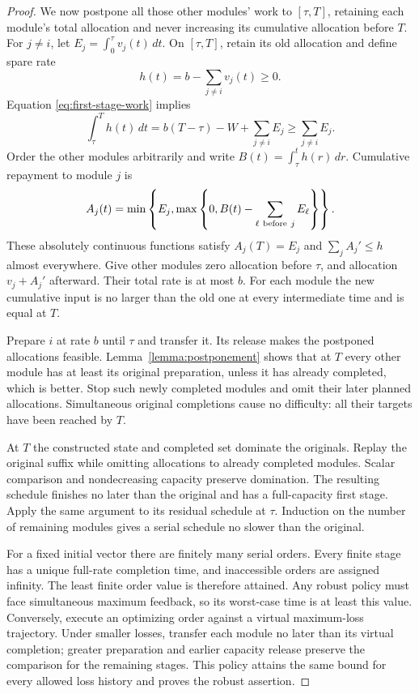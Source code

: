 \begin{proof}
We now postpone all those other modules' work to \([\tau,T]\), retaining
each module's total allocation and never increasing its cumulative allocation
before \(T\). For \(j\ne i\), let
\(E_j=\int_0^\tau v_j(t)\,dt\). On \([\tau,T]\), retain its old allocation
and define spare rate
\[
 h(t)=b-\sum_{j\ne i}v_j(t)\geq0.
\]
Equation \eqref{eq:first-stage-work} implies
\[
 \int_\tau^T h(t)\,dt
 =b(T-\tau)-W+\sum_{j\ne i}E_j
 \geq\sum_{j\ne i}E_j.
\]
Order the other modules arbitrarily and write
\(B(t)=\int_\tau^t h(r)\,dr\). Cumulative repayment to module \(j\) is
\[
 A_j(t)=\min\left\{E_j,
       \max\left\{0,B(t)-\sum_{\ell\ {\rm before}\ j}E_\ell\right\}\right\}.
\]
These absolutely continuous functions satisfy \(A_j(T)=E_j\) and
\(\sum_j A_j'\leq h\) almost everywhere. Give other modules zero allocation
before \(\tau\), and allocation \(v_j+A_j'\) afterward. Their total rate is at
most \(b\). For each module the new cumulative input is no larger than the
old one at every intermediate time and is equal at \(T\).

Prepare \(i\) at rate \(b\) until \(\tau\) and transfer it. Its release makes
the postponed allocations feasible. Lemma~\ref{lemma:postponement} shows that
at \(T\) every other module has at least its original preparation, unless it
has already completed, which is better. Stop such newly completed modules
and omit their later planned allocations. Simultaneous original completions
cause no difficulty: all their targets have been reached by \(T\).

At \(T\) the constructed state and completed set dominate the originals.
Replay the original suffix while omitting allocations to already completed
modules. Scalar comparison and nondecreasing capacity preserve domination.
The resulting schedule finishes no later than the original and has a
full-capacity first stage. Apply the same argument to its residual schedule
at \(\tau\). Induction on the number of remaining modules gives a serial
schedule no slower than the original.

For a fixed initial vector there are finitely many serial orders. Every
finite stage has a unique full-rate completion time, and inaccessible orders
are assigned infinity. The least finite order value is therefore attained.
Any robust policy must face simultaneous maximum feedback, so its
worst-case time is at least this value. Conversely, execute an optimizing
order against a virtual maximum-loss trajectory. Under smaller losses,
transfer each module no later than its virtual completion; greater
preparation and earlier capacity release preserve the comparison for the
remaining stages. This policy attains the same bound for every allowed loss
history and proves the robust assertion.
\end{proof}

